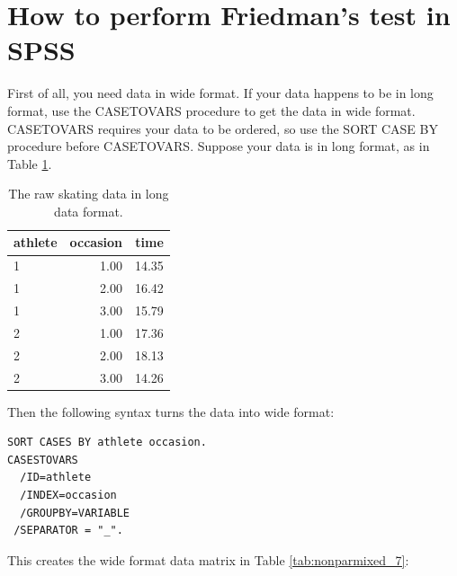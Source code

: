 \documentclass[]{book}\usepackage[]{graphicx}\usepackage[]{color}
\begin{document}
\section{How to perform Friedman's test in SPSS}

First of all, you need data in wide format. If your data happens to be in long format, use the CASETOVARS procedure to get the data in wide format. CASETOVARS requires your data to be ordered, so use the SORT CASE BY procedure before CASETOVARS. Suppose your data is in long format, as in Table \ref{tab:nonparmixed_6}.

\begin{table}[ht]
\centering
\caption{The raw skating data in long data format.} 
\label{tab:nonparmixed_6}
\begin{tabular}{lrr}
  \hline
athlete & occasion & time \\ 
  \hline
1 & 1.00 & 14.35 \\ 
  1 & 2.00 & 16.42 \\ 
  1 & 3.00 & 15.79 \\ 
  2 & 1.00 & 17.36 \\ 
  2 & 2.00 & 18.13 \\ 
  2 & 3.00 & 14.26 \\ 
   \hline
\end{tabular}
\end{table}



Then the following syntax turns the data into wide format:


\begin{verbatim}
SORT CASES BY athlete occasion.
CASESTOVARS
  /ID=athlete
  /INDEX=occasion
  /GROUPBY=VARIABLE
 /SEPARATOR = "_".
\end{verbatim}


This creates the wide format data matrix in Table \ref{tab:nonparmixed_7}:
\end{document}

